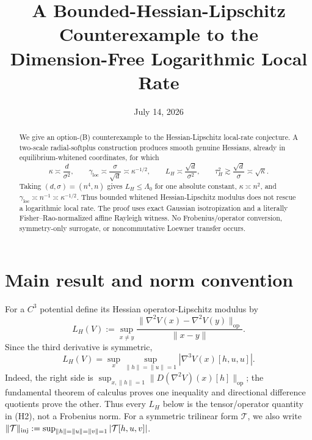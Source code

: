 \documentclass[11pt]{article}
\title{A Bounded-Hessian-Lipschitz Counterexample to the\\
Dimension-Free Logarithmic Local Rate}
\author{}
\date{July 14, 2026}
\numberwithin{equation}{section}
\newcommand{\op}{\mathrm{op}}
\newcommand{\loc}{\mathrm{loc}}
\begin{document}
\maketitle

\begin{abstract}
We give an option-(B) counterexample to the Hessian-Lipschitz local-rate
conjecture.  A two-scale radial-softplus construction produces smooth genuine
Hessians, already in equilibrium-whitened coordinates, for which
\[
 \kappa\asymp \frac d{\sigma^2},\qquad
 \gamma_{\loc}\asymp\frac{\sigma}{\sqrt d}\asymp\kappa^{-1/2},\qquad
 L_H\asymp\frac{\sqrt d}{\sigma^2},\qquad
 \tau_H^2\gtrsim\frac{\sqrt d}{\sigma}\asymp\sqrt\kappa.
\]
Taking $(d,\sigma)=(n^4,n)$ gives $L_H\le\Lambda_0$ for one absolute
constant, $\kappa\asymp n^2$, and
$\gamma_{\loc}\asymp n^{-1}\asymp\kappa^{-1/2}$.  Thus bounded whitened
Hessian-Lipschitz modulus does not rescue a logarithmic local rate.  The proof
uses exact Gaussian isotropization and a literally Fisher--Rao-normalized
affine Rayleigh witness.  No Frobenius/operator conversion, symmetry-only
surrogate, or noncommutative Loewner transfer occurs.
\end{abstract}

\section{Main result and norm convention}

For a $C^3$ potential define its Hessian operator-Lipschitz modulus by
\[
 L_H(V):=\sup_{x\ne y}
 \frac{\|\nabla^2V(x)-\nabla^2V(y)\|_{\op}}{\|x-y\|}.
\]
Since the third derivative is symmetric,
\begin{equation}\label{eq:tensor-lip}
 L_H(V)=\sup_x\sup_{\|h\|=\|u\|=1}
 |\nabla^3V(x)[h,u,u]|.
\end{equation}
Indeed, the right side is
$\sup_{x,\|h\|=1}\|D(\nabla^2V)(x)[h]\|_{\op}$; the fundamental theorem of
calculus proves one inequality and directional difference quotients prove the
other.  Thus every $L_H$ below is the tensor/operator quantity in (H2), not a
Frobenius norm.
For a symmetric trilinear form $\mathcal T$, we also write
$\|\mathcal T\|_{\rm inj}:=\sup_{\|h\|=\|u\|=\|v\|=1}
|\mathcal T[h,u,v]|$.
\end{document}
